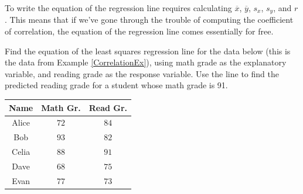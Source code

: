 \begin{remark}
To write the equation of the regression line requires calculating $\overline{x}$, $\overline{y}$, $s_x$, $s_y$, and $r$. This means that if we've gone through the trouble of computing the coefficient of correlation, the equation of the regression line comes essentially for free.
\end{remark}

\begin{example}\label{GradesRegressionEx} Find the equation of the least squares regression line for the data below (this is the data from Example \ref{CorrelationEx}), using math grade as the explanatory variable, and reading grade as the response variable. Use the line to find the predicted reading grade for a student whose math grade is 91.

\begin{center}
\begin{minipage}{0.4\textwidth}
\renewcommand{\arraystretch}{1.25}
\begin{center}
\begin{tabular}{|c|c|c|}
\hline
Name & Math Gr. & Read Gr. \\
\hline
Alice & $72$ & $84$ \\
\hline
Bob & $93$ & $82$  \\
\hline
Celia & $88$ & $91$  \\
\hline
Dave & $68$ & $75$  \\
\hline
Evan & $77$ & $73$  \\
\hline
\end{tabular}
\vspace*{0.1in}
\end{center}
\end{minipage}\begin{minipage}{0.4\textwidth}
\begin{center}
\end{center}
\end{minipage}
\end{center}
\end{example}
